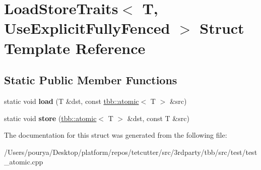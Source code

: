 \hypertarget{structLoadStoreTraits_3_01T_00_01UseExplicitFullyFenced_01_4}{}\section{Load\+Store\+Traits$<$ T, Use\+Explicit\+Fully\+Fenced $>$ Struct Template Reference}
\label{structLoadStoreTraits_3_01T_00_01UseExplicitFullyFenced_01_4}
\subsection*{Static Public Member Functions}
\begin{DoxyCompactItemize}
\item 
\hypertarget{structLoadStoreTraits_3_01T_00_01UseExplicitFullyFenced_01_4_abf010b42ce63b40255a5c77f5bca3cd9}{}static void {\bfseries load} (T \&dst, const \hyperlink{structtbb_1_1atomic}{tbb\+::atomic}$<$ T $>$ \&src)\label{structLoadStoreTraits_3_01T_00_01UseExplicitFullyFenced_01_4_abf010b42ce63b40255a5c77f5bca3cd9}

\item 
\hypertarget{structLoadStoreTraits_3_01T_00_01UseExplicitFullyFenced_01_4_ac4ab6761993718956644b425e9287021}{}static void {\bfseries store} (\hyperlink{structtbb_1_1atomic}{tbb\+::atomic}$<$ T $>$ \&dst, const T \&src)\label{structLoadStoreTraits_3_01T_00_01UseExplicitFullyFenced_01_4_ac4ab6761993718956644b425e9287021}

\end{DoxyCompactItemize}


The documentation for this struct was generated from the following file\+:\begin{DoxyCompactItemize}
\item 
/\+Users/pourya/\+Desktop/platform/repos/tetcutter/src/3rdparty/tbb/src/test/test\+\_\+atomic.\+cpp\end{DoxyCompactItemize}
